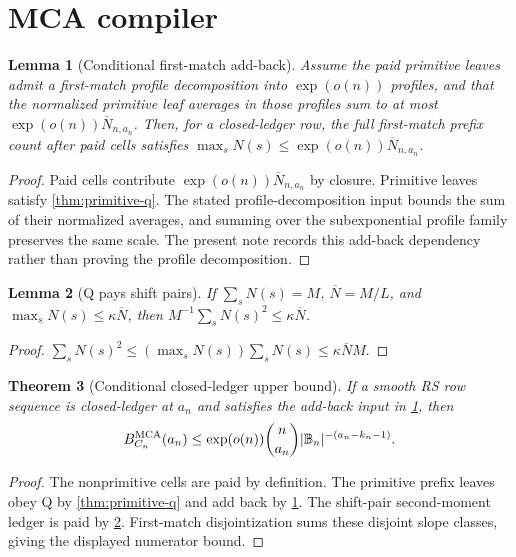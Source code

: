 \documentclass[11pt,a4paper]{amsart}
\numberwithin{equation}{section}
\newtheorem{theorem}{Theorem}[section]
\newtheorem{lemma}[theorem]{Lemma}
\theoremstyle{remark}
\newcommand{\B}{\mathbb B}
\newcommand{\barN}{\overline N}
\begin{document}
\section{MCA compiler}

\begin{lemma}[Conditional first-match add-back]\label{lem:addback}
Assume the paid primitive leaves admit a first-match profile decomposition into \(\exp(o(n))\) profiles, and that the normalized primitive leaf averages in those profiles sum to at most \(\exp(o(n))\barN_{n,a_n}\).  Then, for a closed-ledger row, the full first-match prefix count after paid cells satisfies \(\max_sN(s)\le\exp(o(n))\barN_{n,a_n}\).
\end{lemma}

\begin{proof}
Paid cells contribute \(\exp(o(n))\barN_{n,a_n}\) by closure.  Primitive leaves satisfy \cref{thm:primitive-q}.  The stated profile-decomposition input bounds the sum of their normalized averages, and summing over the subexponential profile family preserves the same scale.  The present note records this add-back dependency rather than proving the profile decomposition.
\end{proof}

\begin{lemma}[Q pays shift pairs]\label{lem:q-sp}
If \(\sum_sN(s)=M\), \(\barN=M/L\), and \(\max_sN(s)\le \kappa\barN\), then \(M^{-1}\sum_sN(s)^2\le\kappa\barN\).
\end{lemma}

\begin{proof}
\(\sum_sN(s)^2\le(\max_sN(s))\sum_sN(s)\le\kappa\barN M\).
\end{proof}

\begin{theorem}[Conditional closed-ledger upper bound]\label{thm:upper}
If a smooth RS row sequence is closed-ledger at \(a_n\) and satisfies the add-back input in \cref{lem:addback}, then
\[
        B_{C_n}^{\rm MCA}(a_n)
        \le \exp(o(n))\binom n{a_n}|\B_n|^{-(a_n-k_n-1)} .
\]
\end{theorem}

\begin{proof}
The nonprimitive cells are paid by definition.  The primitive prefix leaves obey Q by \cref{thm:primitive-q} and add back by \cref{lem:addback}.  The shift-pair second-moment ledger is paid by \cref{lem:q-sp}.  First-match disjointization sums these disjoint slope classes, giving the displayed numerator bound.
\end{proof}
\end{document}
